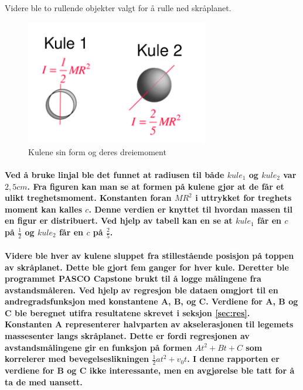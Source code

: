 \documentclass[12pt]{article}
\begin{document}
Videre ble to rullende objekter valgt for å rulle ned skråplanet. \\


\begin{figure}[htp]
    \centering
    \includegraphics[width=8cm]{figur1.png}
    \caption{Kulene sin form og deres dreiemoment}
    \label{fig:kule}
\end{figure}

\paragraph{Ved å bruke linjal ble det funnet at radiusen til både $kule_1$ og $kule_2$ var $2,5 cm$. Fra figuren kan man se at formen på kulene gjør at de får et ulikt treghetsmoment. Konstanten foran $MR^2$ i uttrykket for treghets moment kan kalles $c$. Denne verdien er knyttet til hvordan massen til en figur er distribuert. Ved hjelp av tabell kan en se at $kule_1$  får en $c$ på $\frac{1}{2}$ og $kule_2$ får en $c$ på $\frac{2}{5}$.}

\paragraph{Videre ble hver av kulene sluppet fra stillestående posisjon på toppen av skråplanet. Dette ble gjort fem ganger for hver kule. Deretter ble programmet PASCO Capstone brukt til å logge målingene fra avstandsmåleren. Ved hjelp av regresjon ble dataen omgjort til en andregradsfunksjon med konstantene A, B, og C. Verdiene for A, B og C ble beregnet utifra resultatene skrevet i seksjon \ref{sec:res}. Konstanten A representerer halvparten av akselerasjonen til legemets massesenter langs skråplanet. Dette er fordi regresjonen av avstandsmålingene gir en funksjon på formen $At^2+Bt+C$ som korrelerer med bevegelseslikningen $\frac{1}{2}at^2+v_0t$. I denne rapporten er verdiene for B og C ikke interessante, men en avgjørelse ble tatt for å ta de med uansett.}
\end{document}
